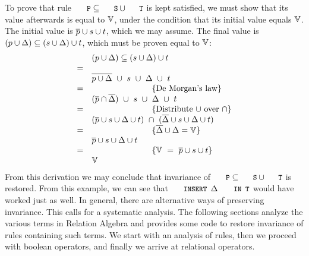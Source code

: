\documentclass{svproc}
\begin{document}
	To prove that rule $\code{P}\subs\code{S}\cup\code{T}$ is kept satisfied,
	we must show that its value afterwards is equal to $\mathbb{V}$,
	under the condition that its initial value equals $\mathbb{V}$.
	The initial value is $\overline{p}\cup s\cup t$, which we may assume.
	The final value is $(p\cup\Delta)\subseteq(s\cup\Delta)\cup t$, which must be proven equal to $\mathbb{V}$:
\[\begin{array}{cl}
&(p\cup\Delta)\subseteq(s\cup\Delta)\cup t\\
=&\\
&\overline{p\cup\Delta}\ \cup\ s\ \cup\ \Delta\ \cup\ t\\
=&\hspace{1in}\{\hbox{De Morgan's law}\}\\
&(\overline{p}\cap\overline{\Delta})\ \cup\ s\ \cup\ \Delta\ \cup\ t\\
=&\hspace{1in}\{\hbox{Distribute $\cup$ over $\cap$}\}\\
&(\overline{p}\cup s\cup\Delta\cup t)\ \cap\ (\overline{\Delta}\cup s\cup\Delta\cup t)\\
=&\hspace{1in}\{\overline{\Delta}\cup\Delta=\mathbb{V}\}\\
&\overline{p}\cup s\cup\Delta\cup t\\
=&\hspace{1in}\{\mathbb{V}\ =\ \overline{p}\cup s\cup t\}\\
&\mathbb{V}
\end{array}\]
	From this derivation we may conclude that invariance of $\code{P}\subs\code{S}\cup\code{T}$ is restored.
	From this example, we can see that $\code{INSERT }\Delta\code{ IN T}$ would have worked just as well.
	In general, there are alternative ways of preserving invariance.
	This calls for a systematic analysis.
	The following sections analyze the various terms in Relation Algebra and provides some code to restore invariance of rules containing such terms.
	We start with an analysis of rules, then we proceed with boolean operators, and finally we arrive at relational operators.
\end{document}
